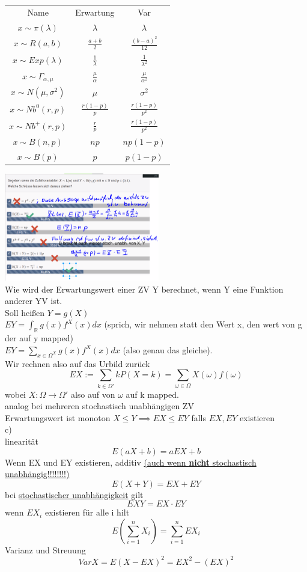 \documentclass{article}
\begin{document}
	\begin{tabular}{c|c|c}
	Name & Erwartung & Var\\
	$x\sim \pi(\lambda)$ &$\lambda$  & $\lambda$ \\
	$x\sim R(a,b)$ &$\frac{a+b}{2}$  & $\frac{(b-a)^2}{12}$  \\
	$x\sim Exp(\lambda)$ & $\frac{1}{\lambda}$ & $\frac{1}{\lambda^2}$ \\
	$x\sim \Gamma_{\alpha,\mu}$ & $\frac{\mu}{\alpha}$  &  $\frac{\mu}{\alpha^2}$\\
	$x\sim N(\mu,\sigma^2)$ & $\mu$ &$\sigma^2$ \\
	$x\sim Nb^0(r,p)$ & $\frac{r(1-p)}{p}$  & $\frac{r(1-p)}{p^2}$\\
	$x\sim Nb^+(r,p)$ &$\frac{r}{p}$  &$\frac{r(1-p)}{p^2}$ \\
	$x\sim B(n,p)$ & $np$& $np(1-p)$\\
	$x\sim B(p)$ & $p$& $p(1-p)$\\
	\end{tabular}
	\includegraphics[width=256px]{Fangfragen.png}\\
	Wie wird der Erwartungswert einer ZV Y berechnet, wenn Y eine Funktion anderer YV ist.\\
	Soll heißen $Y=g(X)$\\
	$EY =\int_\mathbb{R} g(x)f^X(x)dx$ (sprich, wir nehmen statt den Wert x, den wert von g der auf y mapped)\\
	$EY =\sum_{x\in\Omega^X} g(x)f^X(x)dx$ (also genau das gleiche).\\
	Wir rechnen also auf das Urbild zurück
	\[EX:=\sum_{k\in\Omega'} kP(X=k)=\sum_{\omega\in\Omega} X(\omega)f(\omega)\]
	wobei $X:\Omega\to\Omega'$ also auf von $\omega$ auf k mapped.\\
	analog bei mehreren stochastisch unabhängigen ZV\\
	Erwartungswert ist monoton $X\leq Y \implies EX\leq EY$ falls $EX,EY$ existieren\\
	c)\\
	linearität
	\[E(aX+b)=aEX+b\]
	Wenn EX und EY existieren, additiv \underline{(auch wenn \textbf{nicht} stochastisch unabhängig!!!!!!!!)}
	\[E(X+Y)=EX+EY\]
	bei \underline{stochastischer unabhängigkeit} gilt
	\[EXY = EX\cdot EY\]
	wenn $EX_i$ existieren für alle i hilt
	\[E(\sum^n_{i=1}X_i)=\sum^n_{i=1}EX_i\]
	Varianz und Streuung
	\[Var X = E(X-EX)^2 = EX^2 -(EX)^2\]
\end{document}

